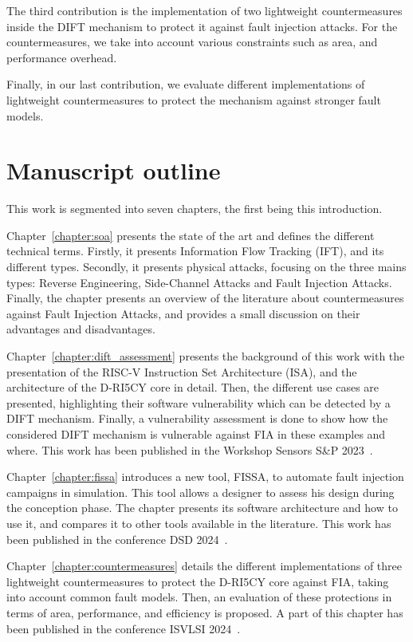The third contribution is the implementation of two lightweight countermeasures inside the DIFT mechanism to protect it against fault injection attacks. For the countermeasures, we take into account various constraints such as area, and performance overhead.

Finally, in our last contribution, we evaluate different implementations of lightweight countermeasures to protect the mechanism against stronger fault models.


\section{Manuscript outline}

This work is segmented into seven chapters, the first being this introduction.

Chapter~\ref{chapter:soa} presents the state of the art and defines the different technical terms. Firstly, it presents Information Flow Tracking (IFT), and its different types.
Secondly, it presents physical attacks, focusing on the three mains types: Reverse Engineering, Side-Channel Attacks and Fault Injection Attacks.
Finally, the chapter presents an overview of the literature about countermeasures against Fault Injection Attacks, and provides a small discussion on their advantages and disadvantages.

Chapter~\ref{chapter:dift_assessment} presents the background of this work with the presentation of the RISC-V Instruction Set Architecture (ISA), and the architecture of the D-RI5CY core in detail. Then, the different use cases are presented, highlighting their software vulnerability which can be detected by a DIFT mechanism. Finally, a vulnerability assessment is done to show how the considered DIFT mechanism is vulnerable against FIA in these examples and where. This work has been published in the Workshop Sensors S\&P 2023~\cite{PLG-22-SensorsSP}.

Chapter~\ref{chapter:fissa} introduces a new tool, FISSA, to automate fault injection campaigns in simulation. This tool allows a designer to assess his design during the conception phase. The chapter presents its software architecture and how to use it, and compares it to other tools available in the literature. This work has been published in the conference DSD 2024~\cite{PLG-24-dsd}.

Chapter~\ref{chapter:countermeasures} details the different implementations of three lightweight countermeasures to protect the D-RI5CY core against FIA, taking into account common fault models. Then, an evaluation of these protections in terms of area, performance, and efficiency is proposed. A part of this chapter has been published in the conference ISVLSI 2024~\cite{PRLG-24-isvlsi}.

